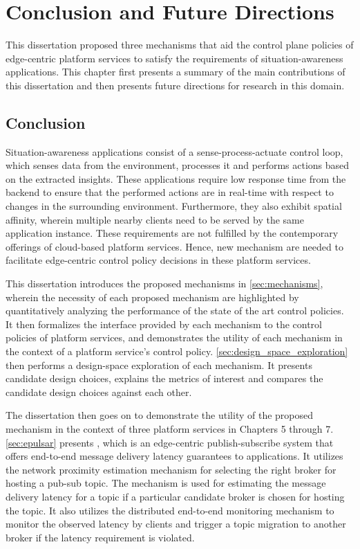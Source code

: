 \chapter{Conclusion and Future Directions}
\label{sec:conclusion}
This dissertation proposed three mechanisms that aid the control plane policies of edge-centric platform services to satisfy the requirements of situation-awareness applications. This chapter first presents a summary of the main contributions of this dissertation and then presents future directions for research in this domain.

\section{Conclusion}
Situation-awareness applications consist of a sense-process-actuate control loop, which senses data from the environment, processes it and performs actions based on the extracted insights. These applications require low response time from the backend to ensure that the performed actions are in real-time with respect to changes in the surrounding environment. Furthermore, they also exhibit spatial affinity, wherein multiple nearby clients need to be served by the same application instance. These requirements are not fulfilled by the contemporary offerings of cloud-based platform services. Hence, new mechanism are needed to facilitate edge-centric control policy decisions in these platform services. 
\par This dissertation introduces the proposed mechanisms in \cref{sec:mechanisms}, wherein the necessity of each proposed mechanism are highlighted by quantitatively analyzing the performance of the state of the art control policies. It then formalizes the interface provided by each mechanism to the control policies of platform services, and demonstrates the utility of each mechanism in the context of a platform service's control policy. \cref{sec:design_space_exploration} then performs a design-space exploration of each mechanism. It presents candidate design choices, explains the metrics of interest and compares the candidate design choices against each other. 
\par The dissertation then goes on to demonstrate the utility of the proposed mechanism in the context of three platform services in Chapters 5 through 7. \cref{sec:epulsar} presents \epulsar{}, which is an edge-centric publish-subscribe system that offers end-to-end message delivery latency guarantees to applications. It utilizes the network proximity estimation mechanism for selecting the right broker for hosting a pub-sub topic. The mechanism is used for estimating the message delivery latency for a topic if a particular candidate broker is chosen for hosting the topic. It also utilizes the distributed end-to-end monitoring mechanism to monitor the observed latency by clients and trigger a topic migration to another broker if the latency requirement is violated.
